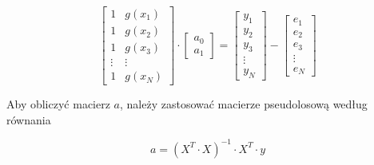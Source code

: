 \begin{equation*}
    \begin{bmatrix}
            1 & g(x_1)\\
            1 & g(x_2)\\
            1 & g(x_3)\\
            \vdots & \vdots \\ 
            1 & g(x_N) 
    \end{bmatrix}
\cdot \begin{bmatrix}
    a_0 \\ a_1 
\end{bmatrix}
 = \begin{bmatrix}
    y_1 \\ y_2 \\ y_3 \\ \vdots \\ y_N
\end{bmatrix} - \begin{bmatrix}
    e_1\\e_2\\e_3\\\vdots\\e_N
\end{bmatrix}
\end{equation*}

Aby obliczyć macierz $a$, należy zastosować macierze pseudolosową
według równania

\begin{equation*}
a = ( X^T \cdot X)^{-1} \cdot X^T \cdot y
\end{equation*}